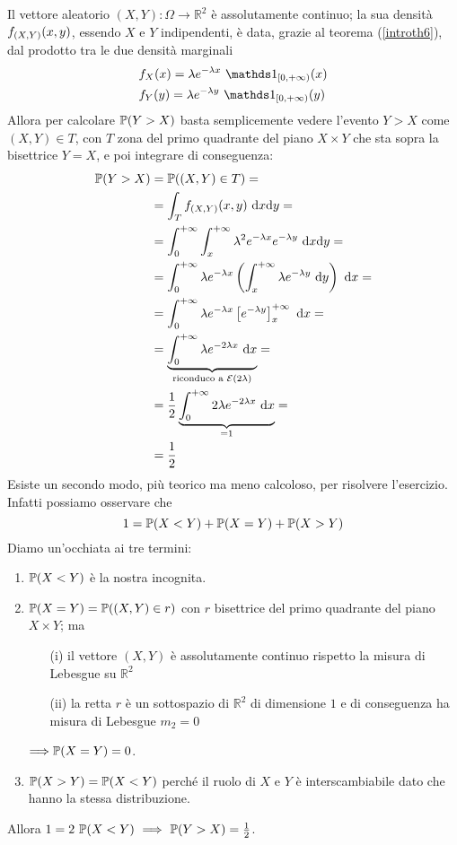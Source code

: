 \Soluzione{}
Il vettore aleatorio $(X,Y):\Omega\to\mathbb{R}^2$ è assolutamente continuo; la sua densità $f_{(X,Y)}(x,y)$, essendo $X$ e $Y$ indipendenti, è data, grazie al  teorema (\ref{introth6}), dal prodotto tra le due densità marginali
\begin{gather*}
\begin{aligned}
&f_X(x)=\lambda e^{-\lambda x}\ \Ind_{[0,+\infty)}(x) \\
&f_Y(y)=\lambda e^{-\lambda y}\ \Ind_{[0,+\infty)}(y)
\end{aligned}
\end{gather*}
Allora per calcolare $\mathbb{P}(Y>X)$ basta semplicemente vedere l'evento $Y>X$ come $(X,Y)\in T$, con $T$ zona del primo quadrante del piano $X\times Y$ che sta sopra la bisettrice $Y=X$, e poi integrare di conseguenza:
\begin{gather*}
\begin{aligned}
\mathbb{P}(Y>X)&=\mathbb{P}((X,Y)\in T)= \\
&=\int_T f_{(X,Y)}(x,y) \text{ d}x\text{d}y= \\
&=\int_0^{+\infty} \int_{x}^{+\infty}\lambda^2e^{-\lambda x}e^{-\lambda y}\text{ d}x\text{d}y= \\
&=\int_0^{+\infty}\lambda e^{-\lambda x} \left(\int_{x}^{+\infty} \lambda e^{-\lambda y}  \text{ d}y  \right)\text{ d}x= \\
&=\int_0^{+\infty}\lambda e^{-\lambda x} \left[ e^{-\lambda y}  \right]_x^{+\infty}\text{ d}x=\\
&=\underbrace{\int_0^{+\infty}\lambda e^{-2\lambda x}\text{ d}x}_{\text{riconduco a }\mathcal{E}(2\lambda)}=\\
&=\frac{1}{2}\underbrace{\int_0^{+\infty}2\lambda e^{-2\lambda x}\text{ d}x}_{=1}=\\
&=\frac{1}{2}
\end{aligned}
\end{gather*}
Esiste un secondo modo, più teorico ma meno calcoloso, per risolvere l'esercizio. Infatti possiamo osservare che
\begin{equation*}
1=\mathbb{P}(X<Y)+\mathbb{P}(X=Y)+\mathbb{P}(X>Y)
\end{equation*}
Diamo un'occhiata ai tre termini:
\begin{enumerate}
\item $\mathbb{P}(X<Y)$ è la nostra incognita.
\item $\mathbb{P}(X=Y)=\mathbb{P}((X,Y)\in r)$ con $r$ bisettrice del primo quadrante del piano $X\times Y$; ma
\begin{enumerate} 
\item [(i)] il vettore $(X,Y)$ è assolutamente continuo rispetto la misura di Lebesgue su $\mathbb{R}^2$
\item [(ii)] la retta $r$ è un sottospazio di $\mathbb{R}^2$ di dimensione $1$ e di conseguenza ha misura di Lebesgue $m_2=0$
\end{enumerate}
$\Longrightarrow \mathbb{P}(X=Y)=0$.
\item $\mathbb{P}(X>Y)=\mathbb{P}(X<Y)$ perché il ruolo di $X$ e $Y$ è interscambiabile dato che hanno la stessa distribuzione.
\end{enumerate}
Allora $1=2\ \PP(X<Y)\ \Longrightarrow\ \PP(Y>X)=\frac{1}{2}$.

